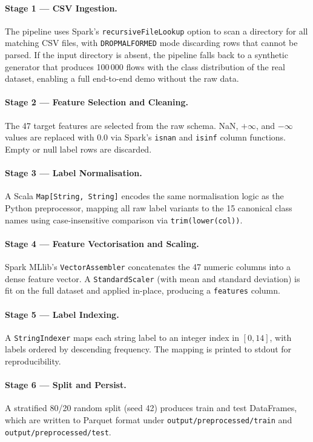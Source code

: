 \documentclass[12pt]{article}
\theoremstyle{plain}
\begin{document}
\paragraph{Stage 1 — CSV Ingestion.}
The pipeline uses Spark's \texttt{recursiveFileLookup} option to scan a directory for all matching CSV files, with \texttt{DROPMALFORMED} mode discarding rows that cannot be parsed. If the input directory is absent, the pipeline falls back to a synthetic generator that produces 100\,000 flows with the class distribution of the real dataset, enabling a full end-to-end demo without the raw data.

\paragraph{Stage 2 — Feature Selection and Cleaning.}
The 47 target features are selected from the raw schema. NaN, $+\infty$, and $-\infty$ values are replaced with 0.0 via Spark's \texttt{isnan} and \texttt{isinf} column functions. Empty or null label rows are discarded.

\paragraph{Stage 3 — Label Normalisation.}
A Scala \texttt{Map[String, String]} encodes the same normalisation logic as the Python preprocessor, mapping all raw label variants to the 15 canonical class names using case-insensitive comparison via \texttt{trim(lower(col))}.

\paragraph{Stage 4 — Feature Vectorisation and Scaling.}
Spark MLlib's \texttt{VectorAssembler} concatenates the 47 numeric columns into a dense feature vector. A \texttt{StandardScaler} (with mean and standard deviation) is fit on the full dataset and applied in-place, producing a \texttt{features} column.

\paragraph{Stage 5 — Label Indexing.}
A \texttt{StringIndexer} maps each string label to an integer index in $[0, 14]$, with labels ordered by descending frequency. The mapping is printed to stdout for reproducibility.

\paragraph{Stage 6 — Split and Persist.}
A stratified 80/20 random split (seed 42) produces train and test DataFrames, which are written to Parquet format under \texttt{output/preprocessed/train} and \texttt{output/preprocessed/test}.
\end{document}
